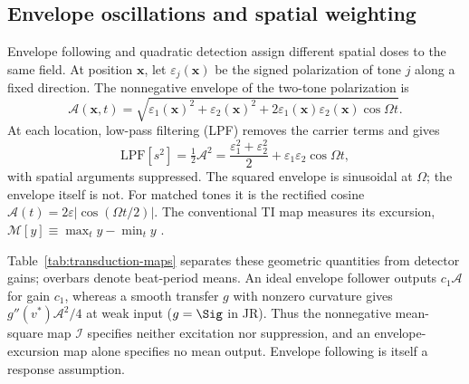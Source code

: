 \subsection{Envelope oscillations and spatial weighting}\label{sec:envelope}
Envelope following and quadratic detection assign different spatial doses
to the same field. At position $\mathbf x$, let $\varepsilon_j(\mathbf x)$ be
the signed polarization of tone $j$ along a fixed direction. The nonnegative
envelope of the two-tone polarization is
\[
\mathcal A(\mathbf x,t)=\sqrt{\varepsilon_1(\mathbf x)^2+\varepsilon_2(\mathbf x)^2
+2\varepsilon_1(\mathbf x)\varepsilon_2(\mathbf x)\cos\Omega t}.
\]
At each location, low-pass filtering (LPF) removes the carrier terms and gives
\begin{equation}
\mathrm{LPF}[s^2]=\tfrac12\mathcal A^2
=\frac{\varepsilon_1^2+\varepsilon_2^2}{2}+\varepsilon_1\varepsilon_2\cos\Omega t,
\label{eq:sqenv}
\end{equation}
with spatial arguments suppressed. The squared envelope is sinusoidal at
$\Omega$; the envelope itself is not. For matched tones it is the rectified
cosine $\mathcal A(t)=2\varepsilon|\cos(\Omega t/2)|$.
The conventional TI map measures its excursion,
$\mathcal M[y]\equiv\max_t y-\min_t y$ \cite{grossman2017}.

Table~\ref{tab:transduction-maps} separates these geometric quantities from
detector gains; overbars denote beat-period means. An ideal envelope follower
outputs $c_1\mathcal A$ for gain $c_1$, whereas a smooth transfer $g$ with
nonzero curvature gives $g''(v^*)\mathcal A^2/4$ at weak input ($g=\Sig$ in JR).
Thus the nonnegative mean-square map $\mathcal I$ specifies neither excitation
nor suppression, and an envelope-excursion map alone specifies no mean output.
Envelope following is itself a response assumption.

